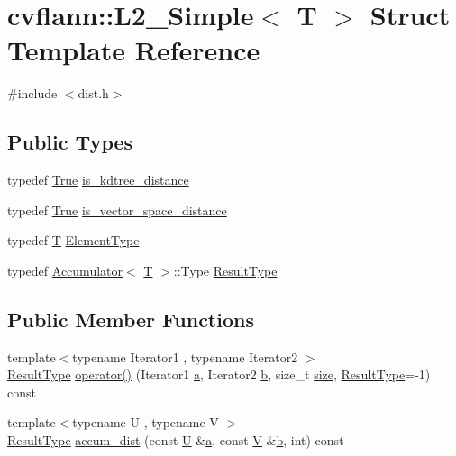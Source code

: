 \hypertarget{structcvflann_1_1L2__Simple}{\section{cvflann\-:\-:L2\-\_\-\-Simple$<$ T $>$ Struct Template Reference}
\label{structcvflann_1_1L2__Simple}
}


{\ttfamily \#include $<$dist.\-h$>$}

\subsection*{Public Types}
\begin{DoxyCompactItemize}
\item 
typedef \hyperlink{classcvflann_1_1True}{True} \hyperlink{structcvflann_1_1L2__Simple_a31398f63f04c3eacf258fc9f79713a36}{is\-\_\-kdtree\-\_\-distance}
\item 
typedef \hyperlink{classcvflann_1_1True}{True} \hyperlink{structcvflann_1_1L2__Simple_acbe5d8b162c1e137bebd06ddb1c24584}{is\-\_\-vector\-\_\-space\-\_\-distance}
\item 
typedef \hyperlink{calib3d_8hpp_a3efb9551a871ddd0463079a808916717}{T} \hyperlink{structcvflann_1_1L2__Simple_a670b89d34d56ea8dad5b4c723c19347b}{Element\-Type}
\item 
typedef \hyperlink{structcvflann_1_1Accumulator}{Accumulator}$<$ \hyperlink{calib3d_8hpp_a3efb9551a871ddd0463079a808916717}{T} $>$\-::Type \hyperlink{structcvflann_1_1L2__Simple_a3eeebcb88e4e8dc88db089c80918f11d}{Result\-Type}
\end{DoxyCompactItemize}
\subsection*{Public Member Functions}
\begin{DoxyCompactItemize}
\item 
{\footnotesize template$<$typename Iterator1 , typename Iterator2 $>$ }\\\hyperlink{structcvflann_1_1L2__Simple_a3eeebcb88e4e8dc88db089c80918f11d}{Result\-Type} \hyperlink{structcvflann_1_1L2__Simple_a97b02b192c382204f982005c4b1fd4da}{operator()} (Iterator1 \hyperlink{legacy_8hpp_a1031d0e0a97a340abfe0a6ab9e831045}{a}, Iterator2 \hyperlink{legacy_8hpp_ac04272e8ca865b8fba18d36edae9fd2a}{b}, size\-\_\-t \hyperlink{legacy_8hpp_ae97003f8d5c64cdfb99f6f2606d121b6}{size}, \hyperlink{structcvflann_1_1L2__Simple_a3eeebcb88e4e8dc88db089c80918f11d}{Result\-Type}=-\/1) const 
\item 
{\footnotesize template$<$typename U , typename V $>$ }\\\hyperlink{structcvflann_1_1L2__Simple_a3eeebcb88e4e8dc88db089c80918f11d}{Result\-Type} \hyperlink{structcvflann_1_1L2__Simple_a877ff5d391a4c665f472e5bedcef5243}{accum\-\_\-dist} (const \hyperlink{core__c_8h_aa9c521f41af9a5191e5e4b6ffbae211a}{U} \&\hyperlink{legacy_8hpp_a1031d0e0a97a340abfe0a6ab9e831045}{a}, const \hyperlink{core__c_8h_ad8dd4fff0e3910932187b6de0543cae1}{V} \&\hyperlink{legacy_8hpp_ac04272e8ca865b8fba18d36edae9fd2a}{b}, int) const 
\end{DoxyCompactItemize}



